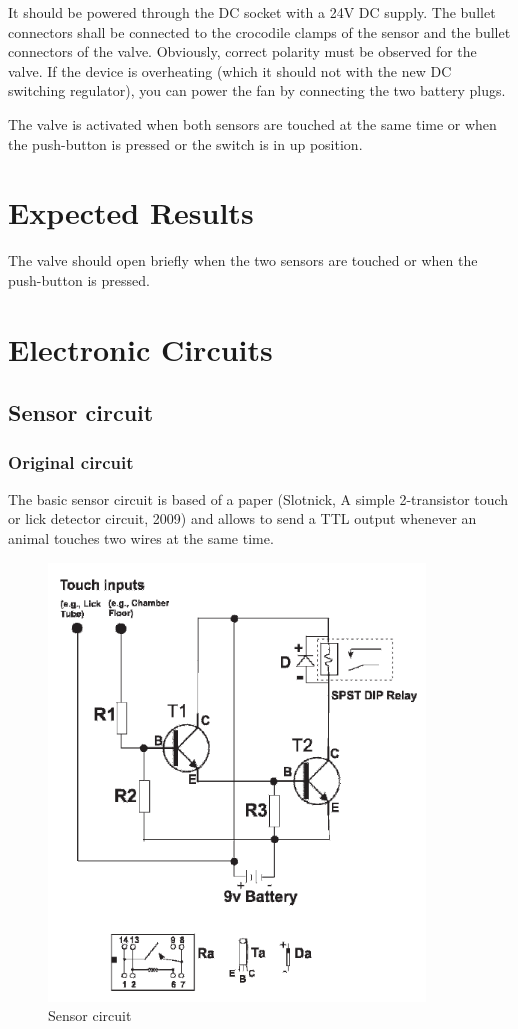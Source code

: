 \documentclass[a4paper]{article}
\begin{document}
It should be powered through the DC socket with a 24V DC supply. The bullet connectors shall be connected to the crocodile clamps of the sensor and the bullet connectors of the valve. Obviously, correct polarity must be observed for the valve.
If the device is overheating (which it should not with the new DC switching regulator), you can power the fan by connecting the two battery plugs.

The valve is activated when both sensors are touched at the same time or when the push-button is pressed or the switch is in up position.

\section{Expected Results}
The valve should open briefly when the two sensors are touched or when the push-button is pressed.
\section{Electronic Circuits}
\subsection{Sensor circuit}
\subsubsection{Original circuit}
The basic sensor circuit is based of a paper (Slotnick, A simple 2-transistor touch or lick detector circuit, 2009) and allows to send a TTL output whenever an animal touches two wires at the same time.

\begin{figure}[h!]
    \centering
    \includegraphics[width = 10cm]{images/sensor.png}
    \caption{Sensor circuit}
    \label{fig:sensor}
\end{figure}
\end{document}
